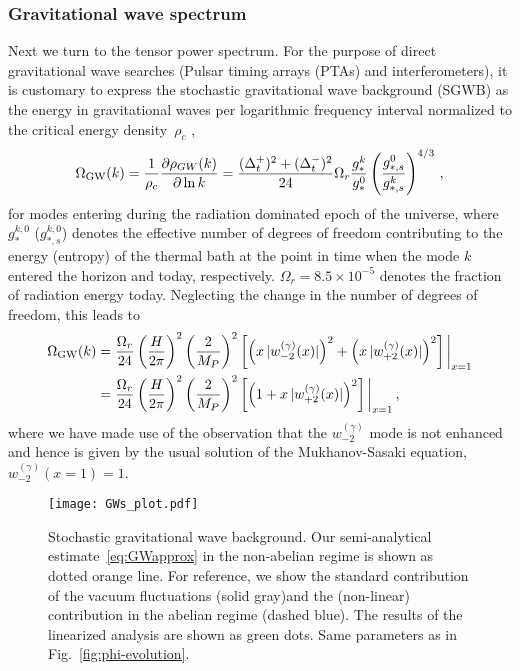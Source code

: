 \subsubsection{Gravitational wave spectrum \label{subsec:TS}}
Next we turn to the tensor power spectrum. For the purpose of direct gravitational wave searches (Pulsar timing arrays (PTAs) and interferometers), it is customary to express the stochastic gravitational wave background (SGWB) as the energy in gravitational waves per logarithmic frequency interval normalized to the critical energy density~$\rho_c$ \cite{Turner:1993vb,Seto:2003kc,Smith:2005mm}, 
\begin{equation}
 \Omega_{\rm GW}(k) = \frac{1}{\rho_c} \frac{\partial \rho_{GW}(k)}{\partial \ln k}  = \frac{(\Delta_t^+)^2 + (\Delta_t^-)^2}{24} \Omega_r \frac{g_*^k}{g_*^0} \left( \frac{g_{*,s}^0}{g_{*,s}^k} \right)^{4/3} \,,
\end{equation}
for modes entering during the radiation dominated epoch of the universe, where $g_*^{k,0}$ ($g_{*,s}^{k,0}$) denotes the effective number of degrees of freedom contributing to the energy (entropy) of the thermal bath at the point in time when the mode $k$ entered the horizon and today, respectively. $\Omega_r = 8.5 \times 10^{-5}$ denotes the fraction of radiation energy today. Neglecting the change in the number of degrees of freedom, this leads to
\begin{align}
 \Omega_{\rm GW}(k) & = \frac{\Omega_r}{24} \left( \frac{H}{2 \pi}\right)^2 \left( \frac{2}{M_P}\right)^2 \left[  \left(  x \, |w^{(\gamma)}_{-2}(x)| \right)^2  +  \left( x \, |w^{(\gamma)}_{+2}(x)| \right)^2 \right]\bigg|_{x = 1}  \\
 & = \frac{\Omega_r}{24} \left( \frac{H}{2 \pi}\right)^2 \left( \frac{2}{M_P}\right)^2 \left[  \left( 1  +  x \, |w^{(\gamma)}_{+2}(x)| \right)^2 \right]\bigg|_{x = 1}  \,,
 \label{eq:OmegaGW} 
\end{align}
where we have made use of the observation that the $w_{-2}^{(\gamma)}$ mode is not enhanced and hence is given by the usual solution of the Mukhanov-Sasaki equation, $w_{-2}^{(\gamma)}(x = 1) = 1 $.

\begin{figure}
\centering
\texttt{[image: GWs\_plot.pdf]}
\caption{Stochastic gravitational wave background. Our semi-analytical estimate~\eqref{eq:GWapprox} in the non-abelian regime  is shown as dotted orange line. For reference, we show the standard contribution of the vacuum fluctuations (solid gray)and the (non-linear) contribution in the abelian regime (dashed blue). The results of the linearized analysis are shown as green dots. Same parameters as in Fig.~\ref{fig:phi-evolution}.}
 \label{fig:spectraGW}
\end{figure}


